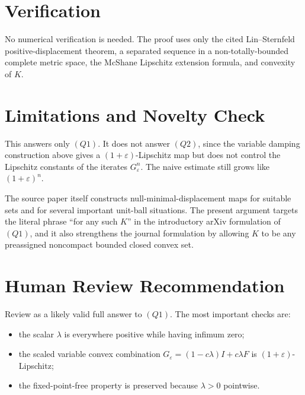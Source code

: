 \documentclass[11pt]{article}
\begin{document}
\section*{Verification}

No numerical verification is needed.  The proof uses only the cited
Lin--Sternfeld positive-displacement theorem, a separated sequence in a
non-totally-bounded complete metric space, the McShane Lipschitz extension
formula, and convexity of \(K\).

\section*{Limitations and Novelty Check}

This answers only \((Q1)\).  It does not answer \((Q2)\), since the
variable damping construction above gives a \((1+\varepsilon)\)-Lipschitz
map but does not control the Lipschitz constants of the iterates
\(G_\varepsilon^n\).  The naive estimate still grows like
\((1+\varepsilon)^n\).

The source paper itself constructs null-minimal-displacement maps for suitable
sets and for several important unit-ball situations.  The present argument
targets the literal phrase ``for any such \(K\)'' in the introductory arXiv
formulation of \((Q1)\), and it also strengthens the journal formulation by
allowing \(K\) to be any preassigned noncompact bounded closed convex set.

\section*{Human Review Recommendation}

Review as a likely valid full answer to \((Q1)\).  The most important
checks are:
\begin{itemize}
\item the scalar \(\lambda\) is everywhere positive while having infimum
zero;
\item the scaled variable convex combination
\(G_\varepsilon=(1-c\lambda)I+c\lambda F\) is
\((1+\varepsilon)\)-Lipschitz;
\item the fixed-point-free property is preserved because \(\lambda>0\)
pointwise.
\end{itemize}
\end{document}
